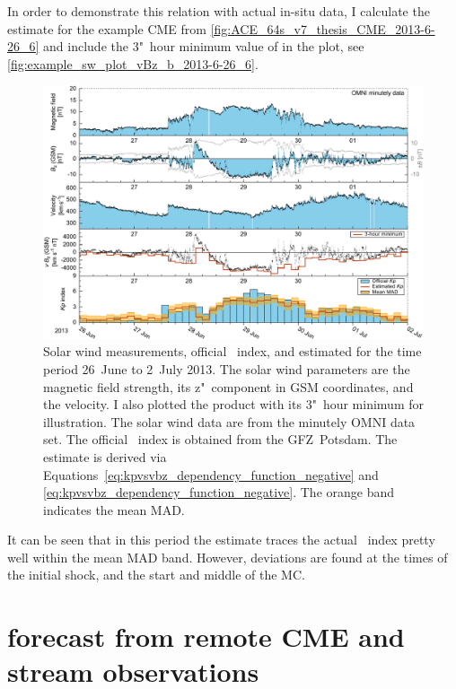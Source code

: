 In order to demonstrate this relation with actual in-situ data, I calculate the \Kp{} estimate for the example CME from \autoref{fig:ACE_64s_v7_thesis_CME_2013-6-26_6} and include the 3"~hour minimum value of \vBz{} in the plot, see \autoref{fig:example_sw_plot_vBz_b_2013-6-26_6}.
\begin{figure}[htb]
	\centering
	\includegraphics[width=\textwidth]{figures_of_mine/chapter2/example_sw_plot_vBz_b_2013-6-26_6.pdf}
	\caption[]
	{Solar wind measurements, official \Kp{}~index, and estimated \Kp{} for the time period 26~June to 2~July 2013. The solar wind parameters are the magnetic field strength, its z"~component in GSM coordinates, and the velocity. I also plotted the product \vBz{} with its 3"~hour minimum for illustration. The solar wind data are from the minutely OMNI data set. The official \Kp{}~index is obtained from the GFZ~Potsdam. The \Kp{} estimate is derived via Equations~\ref{eq:kpvsvbz_dependency_function_negative} and \ref{eq:kpvsvbz_dependency_function_negative}. The orange band indicates the mean MAD.}
	\label{fig:example_sw_plot_vBz_b_2013-6-26_6}
\end{figure}
It can be seen that in this period the \Kp{} estimate traces the actual \Kp{}~index pretty well within the mean MAD band. However, deviations are found at the times of the initial shock, and the start and middle of the MC.\\



\section{\Kp{} forecast from remote CME and stream observations}
\label{sec:kp_forecast_from_remote_CME_and_stream_observations}

